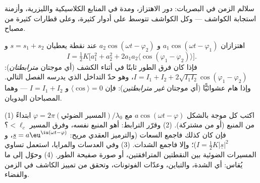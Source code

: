 \begin{omfigure}

{\small سلالم الزمن في البصريات: دور الاهتزاز، ومدة
 في المنابع الكلاسيكية والليزرية، وأزمنة
استجابة الكواشف --- وكل الكواشف تتوسط على أدوار
كثيرة، وعلى قطارات كثيرة من مصباح.}
\end{omfigure}

\begin{remark}\label{rem:b2:scalar-light-model:superposition}
اهتزازان $a_1\cos(\omega t - \varphi_1)$ و $a_2\cos(\omega t - \varphi_2)$ عند
نقطة يعطيان $s = s_1 + s_2$ و
\[
I = \tfrac12K\bigl[a_1^2 + a_2^2 + 2a_1a_2\langle\cos(\varphi_1 - \varphi_2)\rangle\bigr] .
\]
فإذا كان فرق الطور ثابتًا في أثناء الكشف
(أي موجتان \emph{مترابطتان}): $I = I_1 + I_2 + 2\sqrt{I_1I_2}\cos(\varphi_1 - \varphi_2)$،
وهو حدّ التداخل الذي يدرسه الفصل التالي. وإذا هام
عشوائيًّا (أي موجتان \emph{غير مترابطتين}): فإن $\langle\cos\rangle = 0$ و $I = I_1 +
I_2$ --- وهما المصباحان اليدويان.
\end{remark}

\begin{method}\label{met:b2:scalar-light-model:method}
(1) اكتب كل موجة بالشكل $a\cos(\omega t - \varphi)$ مع $\varphi = 2\pi(\text{المسير
الضوئي})/\lambda_0$ ابتداءً من المنبع (أو من  مشتركة). (2) وقرّر
الترابط: أهو المنبع نفسه، وفرق المسير $< \ell_c$؟ فإن كان كذلك فاجمع السعات
(والترميز العقدي مريح: $\underline s = a\eu^{\iu(\omega t - \varphi)}$، و $I =
\tfrac12K|\underline s|^2$)؛ وإلا فاجمع الشدات. (3) وفي العدسات
والمرايا، استعمل تساوي المسيرات الضوئية بين النقطتين المترافقتين، أو
صورة صفيحة الطور. (4) وحوّل إلى ما يُقاس: أي الشدة،
والتباين، وعدّات الفوتونات، وتحقق من تمييز الكاشف في الزمن
والفضاء.
\end{method}

